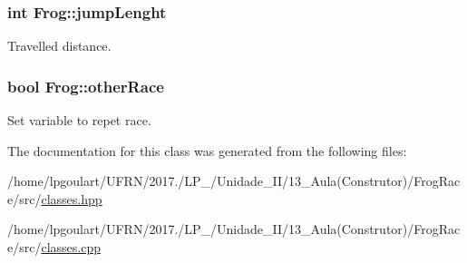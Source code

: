 \subsubsection[{\texorpdfstring{jump\+Lenght}{jumpLenght}}]{\setlength{\rightskip}{0pt plus 5cm}int Frog\+::jump\+Lenght\hspace{0.3cm}{\ttfamily [private]}}\hypertarget{classFrog_a8ce20ccfa8a10afc1465a2c60e33b53d}{}\label{classFrog_a8ce20ccfa8a10afc1465a2c60e33b53d}


Travelled distance. 

\subsubsection[{\texorpdfstring{other\+Race}{otherRace}}]{\setlength{\rightskip}{0pt plus 5cm}bool Frog\+::other\+Race\hspace{0.3cm}{\ttfamily [static]}}\hypertarget{classFrog_a3069c74fde5e33eb58c40c655b1ad8f7}{}\label{classFrog_a3069c74fde5e33eb58c40c655b1ad8f7}


Set variable to repet race. 



The documentation for this class was generated from the following files\+:\begin{DoxyCompactItemize}
\item 
/home/lpgoulart/\+U\+F\+R\+N/2017./\+L\+P\+\_/\+Unidade\+\_\+\+I\+I/13\+\_\+\+Aula(\+Construtor)/\+Frog\+Race/src/\hyperlink{classes_8hpp}{classes.\+hpp}\item 
/home/lpgoulart/\+U\+F\+R\+N/2017./\+L\+P\+\_/\+Unidade\+\_\+\+I\+I/13\+\_\+\+Aula(\+Construtor)/\+Frog\+Race/src/\hyperlink{classes_8cpp}{classes.\+cpp}\end{DoxyCompactItemize}
